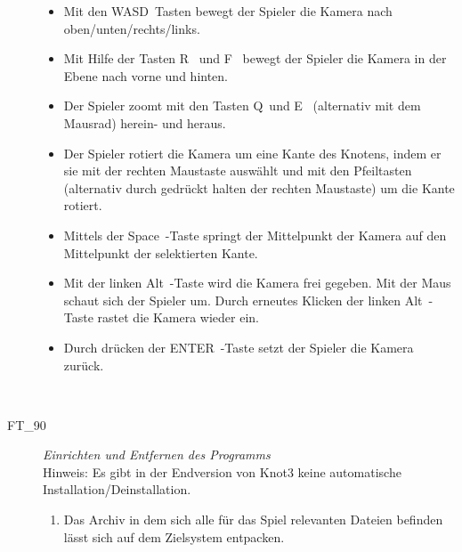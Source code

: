 \begin{description}
	\begin{itemize} 
	
        \item Mit den \glqq WASD\grqq~Tasten bewegt der Spieler die Kamera nach oben/unten/rechts/links.
        
        \item Mit Hilfe der Tasten \glqq R\grqq~ und \glqq F\grqq~ bewegt der Spieler die Kamera in der Ebene nach vorne und hinten.
        
        \item Der Spieler zoomt mit den Tasten \glqq Q\grqq~und \glqq E\grqq~ (alternativ mit dem Mausrad) herein- und heraus.
        
        \item Der Spieler rotiert die Kamera um eine Kante des Knotens, indem er sie mit der rechten Maustaste auswählt und mit den Pfeiltasten (alternativ durch gedrückt halten der rechten Maustaste) um die Kante rotiert.
        
        \item Mittels der \glqq Space\grqq~-Taste springt der Mittelpunkt der Kamera auf den Mittelpunkt der selektierten Kante.
        
        \item Mit der linken \glqq Alt\grqq~-Taste wird die Kamera frei gegeben. Mit der Maus schaut sich der Spieler um. Durch erneutes Klicken der linken \glqq Alt\grqq~-Taste rastet die Kamera wieder ein.
        
        \item Durch drücken der \glqq ENTER\grqq~-Taste setzt der Spieler die Kamera zurück.
        
        ~\\
		
		\end{itemize}
		
		

\label{FT:90}

	\item[FT\_90] \textit{Einrichten und Entfernen des Programms} \hfill\\

	Hinweis: Es gibt in der Endversion von Knot3 keine automatische Installation/Deinstallation.\\
		
	\begin{enumerate}

		\item Das Archiv in dem sich alle für das Spiel relevanten Dateien befinden lässt sich auf dem Zielsystem entpacken.
		

\end{enumerate}
\end{description}
